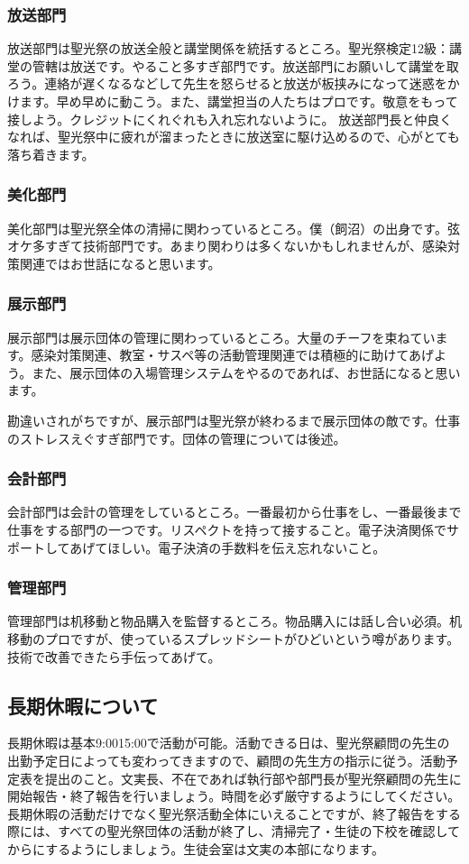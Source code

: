 \documentclass[dvipdfmx,jb5]{jarticle}
\begin{document}
\subsubsection{放送部門}
放送部門は聖光祭の放送全般と講堂関係を統括するところ。聖光祭検定12級：講堂の管轄は放送です。やること多すぎ部門です。放送部門にお願いして講堂を取ろう。連絡が遅くなるなどして先生を怒らせると放送が板挟みになって迷惑をかけます。早め早めに動こう。また、講堂担当の人たちはプロです。敬意をもって接しよう。クレジットにくれぐれも入れ忘れないように。
放送部門長と仲良くなれば、聖光祭中に疲れが溜まったときに放送室に駆け込めるので、心がとても落ち着きます。

\subsubsection{美化部門}
美化部門は聖光祭全体の清掃に関わっているところ。僕（飼沼）の出身です。弦オケ多すぎて技術部門です。あまり関わりは多くないかもしれませんが、感染対策関連ではお世話になると思います。

\subsubsection{展示部門}
展示部門は展示団体の管理に関わっているところ。大量のチーフを束ねています。感染対策関連、教室・サスペ等の活動管理関連では積極的に助けてあげよう。また、展示団体の入場管理システムをやるのであれば、お世話になると思います。

勘違いされがちですが、展示部門は聖光祭が終わるまで展示団体の敵です。仕事のストレスえぐすぎ部門です。団体の管理については後述。

\subsubsection{会計部門}
会計部門は会計の管理をしているところ。一番最初から仕事をし、一番最後まで仕事をする部門の一つです。リスペクトを持って接すること。電子決済関係でサポートしてあげてほしい。電子決済の手数料を伝え忘れないこと。

\subsubsection{管理部門}
管理部門は机移動と物品購入を監督するところ。物品購入には話し合い必須。机移動のプロですが、使っているスプレッドシートがひどいという噂があります。技術で改善できたら手伝ってあげて。

\subsection{長期休暇について}
長期休暇は基本9:0015:00で活動が可能。活動できる日は、聖光祭顧問の先生の出勤予定日によっても変わってきますので、顧問の先生方の指示に従う。活動予定表を提出のこと。文実長、不在であれば執行部や部門長が聖光祭顧問の先生に開始報告・終了報告を行いましょう。時間を必ず厳守するようにしてください。長期休暇の活動だけでなく聖光祭活動全体にいえることですが、終了報告をする際には、すべての聖光祭団体の活動が終了し、清掃完了・生徒の下校を確認してからにするようにしましょう。生徒会室は文実の本部になります。
\end{document}
